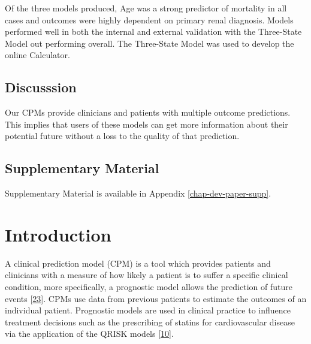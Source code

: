 \documentclass[12pt,PhD,twoside,openright]{muthesis}
\begin{document}
Of the three models produced, Age was a strong predictor of mortality in all cases and outcomes were highly dependent on primary renal diagnosis. Models performed well in both the internal and external validation with the Three-State Model out performing overall. The Three-State Model was used to develop the online Calculator.

\hypertarget{discusssion}{%
\subsection*{Discusssion}\label{discusssion}}

Our CPMs provide clinicians and patients with multiple outcome predictions. This implies that users of these models can get more information about their potential future without a loss to the quality of that prediction.

\hypertarget{supplementary-material-2}{%
\subsection*{Supplementary Material}\label{supplementary-material-2}}

Supplementary Material is available in Appendix \ref{chap-dev-paper-supp}.

\hypertarget{introduction-7}{%
\section{Introduction}\label{introduction-7}}

A clinical prediction model (CPM) is a tool which provides patients and clinicians with a measure of how likely a patient is to suffer a specific clinical condition, more specifically, a prognostic model allows the prediction of future events {[}\protect\hyperlink{ref-steyerberg_prognosis_2013}{23}{]}. CPMs use data from previous patients to estimate the outcomes of an individual patient. Prognostic models are used in clinical practice to influence treatment decisions such as the prescribing of statins for cardiovascular disease via the application of the QRISK models {[}\protect\hyperlink{ref-hippisley-cox_development_2017}{10}{]}.
\end{document}
